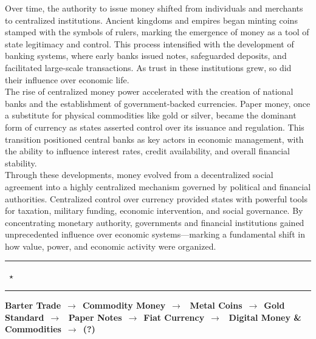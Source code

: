 \documentclass[12pt, a4paper, oneside]{report}
\theoremstyle{definition}
\begin{document}
Over time, the authority to issue money shifted from individuals and merchants to 
centralized institutions. Ancient kingdoms and empires began minting coins stamped 
with the symbols of rulers, marking the emergence of money as a tool of state 
legitimacy and control. This process intensified with the development of banking 
systems, where early banks issued notes, safeguarded deposits, and facilitated 
large-scale transactions. As trust in these institutions grew, so did their influence 
over economic life.\\[0.4cm]

The rise of centralized money power accelerated with the creation of national banks 
and the establishment of government-backed currencies. Paper money, once a substitute 
for physical commodities like gold or silver, became the dominant form of currency as 
states asserted control over its issuance and regulation. This transition positioned 
central banks as key actors in economic management, with the ability to influence 
interest rates, credit availability, and overall financial stability.\\[0.4cm]

Through these developments, money evolved from a decentralized social agreement into 
a highly centralized mechanism governed by political and financial authorities. 
Centralized control over currency provided states with powerful tools for taxation, 
military funding, economic intervention, and social governance. By concentrating 
monetary authority, governments and financial institutions gained unprecedented 
influence over economic systems—marking a fundamental shift in how value, power, 
and economic activity were organized.\\[1.2cm]

\begin{center}
  \rule{0.4\linewidth}{0.3pt}~{\large $\star$}~\rule{0.4\linewidth}{0.3pt}
\end{center}

\vspace{0.6cm}

\begin{center}
\small
\textbf{Barter Trade}~$\rightarrow$~\textbf{Commodity Money}~$\rightarrow$~%
\textbf{Metal Coins}~$\rightarrow$~\textbf{Gold Standard}~$\rightarrow$~%
\textbf{Paper Notes}~$\rightarrow$~\textbf{Fiat Currency}~$\rightarrow$~%
\textbf{Digital Money \& Commodities}~$\rightarrow$~{\large \bfseries (?)}
\end{center}
\end{document}
